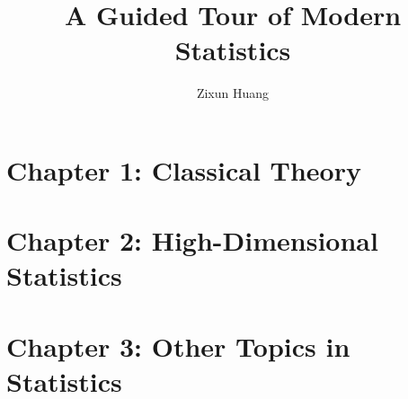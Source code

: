 \documentclass[10pt, oneside]{article}
\title{A Guided Tour of Modern Statistics}
\author{Zixun Huang}
\theoremstyle{notestyle}
\begin{document}
\maketitle
\tableofcontents

\vspace{.25in}

\newpage
\part{Chapter 1: Classical Theory}




\newpage
\part{Chapter 2: High-Dimensional Statistics}




\newpage
\part{Chapter 3: Other Topics in Statistics}




\newpage


\end{document}

